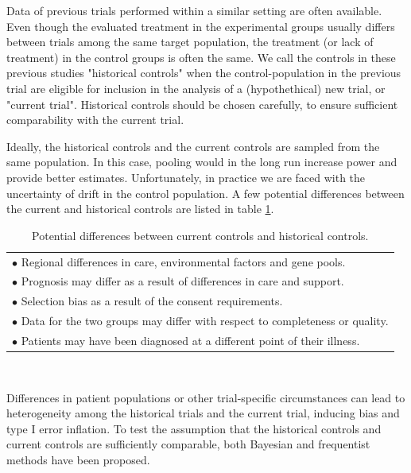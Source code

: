 \documentclass[Royal,sagev,times]{sagej}
\begin{document}
Data of previous trials performed within a similar setting are often available.\cite{vRosmalen2018} Even though the evaluated treatment in the experimental groups usually differs between trials among the same target population, the treatment (or lack of treatment) in the control groups is often the same.\cite{vRosmalen2018} We call the controls in these previous studies "historical controls" when the control-population in the previous trial are eligible for inclusion in the analysis of a (hypothethical) new trial, or "current trial".\cite{vRosmalen2018} Historical controls should be chosen carefully, to ensure sufficient comparability with  the current trial.\cite{vRosmalen2018}

Ideally, the historical controls and the current controls are sampled from the same population. In this case, pooling would in the long run increase power and provide better estimates. Unfortunately, in practice we are faced with the uncertainty of drift in the control population.\cite{viele2014} A few potential differences between the current and historical controls are listed in table \ref{Table:differences}. 

\begin{table}[h!]
\caption{Potential differences between current controls and historical controls.\cite{simmons2009} \label{Table:differences}}
\begin{tabular}{l}
\toprule
$\bullet$ Regional differences in care, environmental factors and gene pools.\\
$\bullet$ Prognosis may differ as a result of differences in care and support. \\
$\bullet$ Selection bias as a result of the consent requirements. \\ 
$\bullet$ Data for the two groups may differ with respect to completeness or quality. \\
$\bullet$ Patients may have been diagnosed at a different point of their illness. \\
\bottomrule
\end{tabular}\\[10pt]
\end{table}
Differences in patient populations or other trial-specific circumstances can lead to heterogeneity among the historical trials and the current trial, \cite{vRosmalen2018} inducing bias and type I error inflation.\cite{viele2014} To test the assumption that the historical controls and current controls are sufficiently comparable, both Bayesian and frequentist methods have been proposed. 
\end{document}
